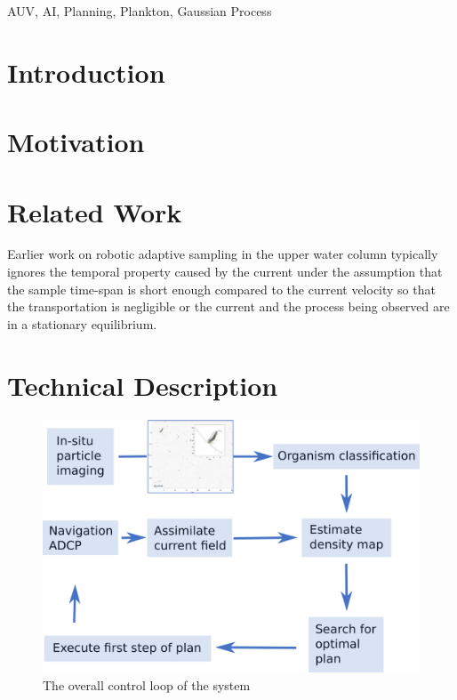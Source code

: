 \documentclass[conference]{IEEEtran}
\begin{document}
\begin{IEEEkeywords}
AUV, AI, Planning, Plankton, Gaussian Process
\end{IEEEkeywords}

\section{Introduction}

\section{Motivation}

\section{Related Work}
Earlier work on robotic adaptive sampling in the upper water column typically ignores the temporal property caused by the current under the assumption that the sample time-span is short enough compared to the current velocity so that the transportation is negligible or the current and the process being observed are in a stationary equilibrium.

\section{Technical Description}

\begin{figure}[tbp]
\centerline{\includegraphics[width=\linewidth]{figures/workflow-simplified.png}}
\caption{The overall control loop of the system}
\label{fig:senseThinkActLoop}
\end{figure}
\end{document}
